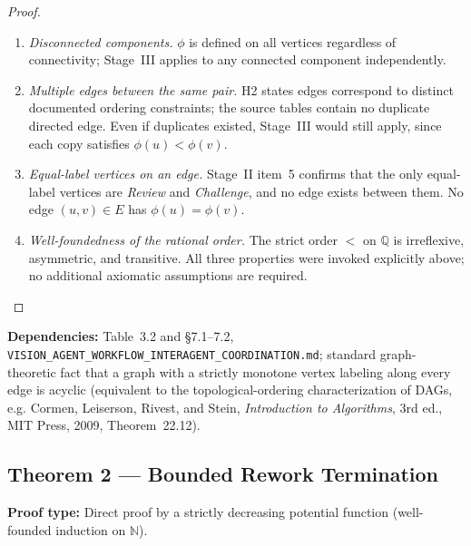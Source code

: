 \documentclass[12pt]{article}
\theoremstyle{definition}
\newcommand{\code}[1]{\texttt{#1}}
\newcommand{\VisionFlow}{\code{VISION\_AGENT\_\allowbreak WORKFLOW\_\allowbreak INTERAGENT\_\allowbreak COORDINATION.md}}
\begin{document}
\begin{proof}
\begin{enumerate}
  \item \emph{Disconnected components.}  $\phi$ is defined on all
        vertices regardless of connectivity; Stage~III applies to any
        connected component independently.

  \item \emph{Multiple edges between the same pair.}  H2 states edges
        correspond to distinct documented ordering constraints; the
        source tables contain no duplicate directed edge.  Even if
        duplicates existed, Stage~III would still apply, since each copy
        satisfies $\phi(u) < \phi(v)$.

  \item \emph{Equal-label vertices on an edge.}  Stage~II item~5
        confirms that the only equal-label vertices are
        \textit{Review} and \textit{Challenge}, and no edge exists
        between them.  No edge $(u,v)\in E$ has $\phi(u) = \phi(v)$.

  \item \emph{Well-foundedness of the rational order.}  The strict
        order $<$ on $\mathbb{Q}$ is irreflexive, asymmetric, and
        transitive.  All three properties were invoked explicitly above;
        no additional axiomatic assumptions are required.
\end{enumerate}
\end{proof}

\begin{sloppypar}
\textbf{Dependencies:} Table~3.2 and \S7.1--7.2,
\VisionFlow{}; standard
graph-theoretic fact that a graph with a strictly monotone vertex labeling
along every edge is acyclic (equivalent to the topological-ordering
characterization of DAGs, e.g. Cormen, Leiserson, Rivest, and Stein,
\emph{Introduction to Algorithms}, 3rd ed., MIT Press, 2009, Theorem~22.12).
\end{sloppypar}

\subsection{Theorem 2 --- Bounded Rework Termination}

\textbf{Proof type:} Direct proof by a strictly decreasing potential
function (well-founded induction on $\mathbb{N}$).
\end{document}
